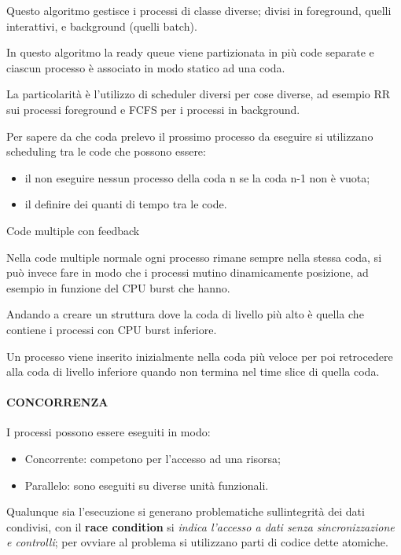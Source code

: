 Questo algoritmo gestisce i processi di classe diverse; divisi in
foreground, quelli interattivi, e background (quelli batch).

In questo algoritmo la ready queue viene partizionata in più code
separate e ciascun processo è associato in modo statico ad una coda.

La particolarità è l'utilizzo di scheduler diversi per cose diverse, ad
esempio RR sui processi foreground e FCFS per i processi in background.

Per sapere da che coda prelevo il prossimo processo da eseguire si
utilizzano scheduling tra le code che possono essere:

\begin{itemize}
\item
  il non eseguire nessun processo della coda n se la coda n-1 non è
  vuota;
\item
  il definire dei quanti di tempo tra le code.
\end{itemize}

Code multiple con feedback

Nella code multiple normale ogni processo rimane sempre nella stessa
coda, si può invece fare in modo che i processi mutino dinamicamente
posizione, ad esempio in funzione del CPU burst che hanno.

Andando a creare un struttura dove la coda di livello più alto è quella
che contiene i processi con CPU burst inferiore.

Un processo viene inserito inizialmente nella coda più veloce per poi
retrocedere alla coda di livello inferiore quando non termina nel time
slice di quella coda.

\paragraph{CONCORRENZA}\label{concorrenza}

I processi possono essere eseguiti in modo:

\begin{itemize}
\item
  Concorrente: competono per l'accesso ad una risorsa;
\item
  Parallelo: sono eseguiti su diverse unità funzionali.
\end{itemize}

Qualunque sia l'esecuzione si generano problematiche
sull\textquotesingle integrità dei dati condivisi, con il \textbf{race
condition} si \emph{indica l'accesso a dati senza sincronizzazione e
controlli}; per ovviare al problema si utilizzano parti di codice dette
atomiche.

